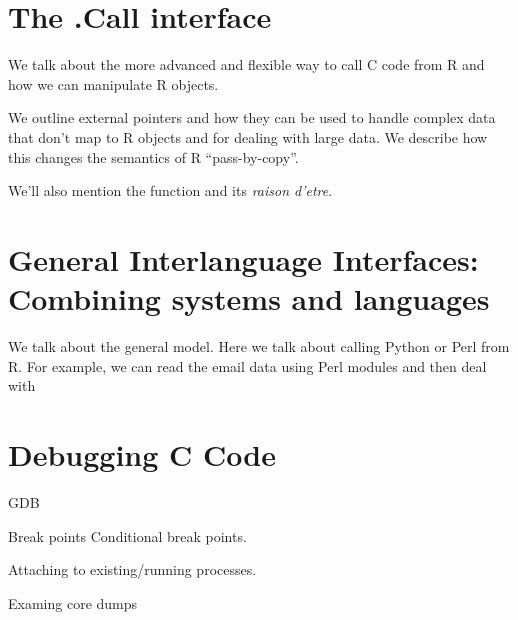 \section{The .Call interface}

We talk about the more advanced and flexible
way to call C code from R and how we can manipulate 
R objects.

We outline external pointers and how they can be used to handle
complex data that don't map to R objects and for dealing with large
data. We describe how this changes the semantics of R ``pass-by-copy''.



We'll also mention the  function
and its \textit{raison d'etre}.

\section{General Interlanguage Interfaces: Combining systems and
  languages}
We talk about the general model.
Here we talk about calling Python or Perl from R.
For example, we can read the email data using Perl modules
and then deal with 


\section{Debugging C Code}
GDB

Break points
Conditional break points.

Attaching to existing/running processes.

Examing core dumps

